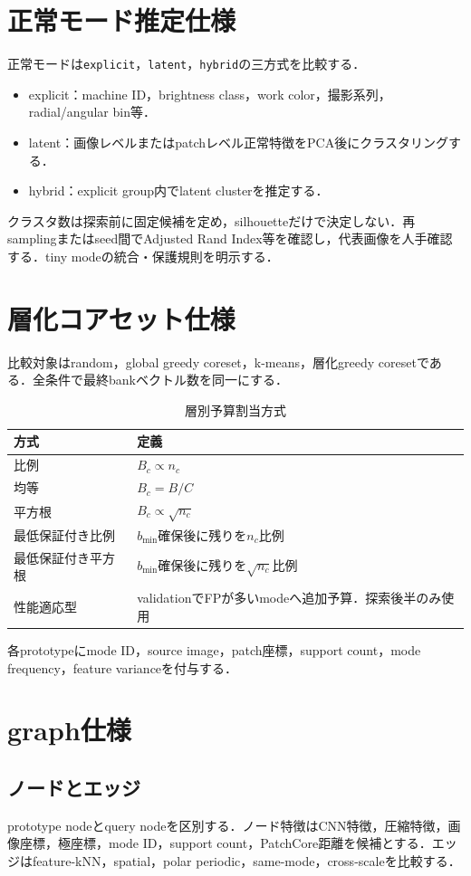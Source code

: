 \documentclass[a4paper,11pt]{ltjsarticle}
\begin{document}
\section{正常モード推定仕様}
正常モードは\texttt{explicit}，\texttt{latent}，\texttt{hybrid}の三方式を比較する．
\begin{itemize}
  \item explicit：machine ID，brightness class，work color，撮影系列，radial/angular bin等．
  \item latent：画像レベルまたはpatchレベル正常特徴をPCA後にクラスタリングする．
  \item hybrid：explicit group内でlatent clusterを推定する．
\end{itemize}
クラスタ数は探索前に固定候補を定め，silhouetteだけで決定しない．再samplingまたはseed間でAdjusted Rand Index等を確認し，代表画像を人手確認する．tiny modeの統合・保護規則を明示する．

\section{層化コアセット仕様}
比較対象はrandom，global greedy coreset，k-means，層化greedy coresetである．全条件で最終bankベクトル数を同一にする．

\begin{table}[H]
\centering
\caption{層別予算割当方式}
\begin{tabularx}{\linewidth}{L{43mm}Y}
\toprule
方式 & 定義 \\
\midrule
比例 & $B_c\propto n_c$ \\
均等 & $B_c=B/C$ \\
平方根 & $B_c\propto\sqrt{n_c}$ \\
最低保証付き比例 & $b_{\min}$確保後に残りを$n_c$比例 \\
最低保証付き平方根 & $b_{\min}$確保後に残りを$\sqrt{n_c}$比例 \\
性能適応型 & validationでFPが多いmodeへ追加予算．探索後半のみ使用 \\
\bottomrule
\end{tabularx}
\end{table}
各prototypeにmode ID，source image，patch座標，support count，mode frequency，feature varianceを付与する．

\section{graph仕様}
\subsection{ノードとエッジ}
prototype nodeとquery nodeを区別する．ノード特徴はCNN特徴，圧縮特徴，画像座標，極座標，mode ID，support count，PatchCore距離を候補とする．エッジはfeature-kNN，spatial，polar periodic，same-mode，cross-scaleを比較する．
\end{document}
